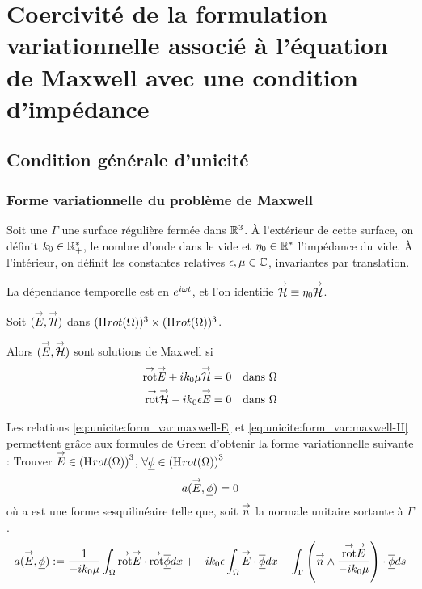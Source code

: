 \section{Coercivité de la formulation variationnelle associé à l'équation de Maxwell avec une condition d'impédance}
	\subsection{Condition générale d'unicité}
		\subsubsection{Forme variationnelle du problème de Maxwell}

			Soit une \(\Gamma\) une surface régulière fermée dans \(\mathbb R^3\). 
			À l'extérieur de cette surface, on définit \(k_0 \in \mathbb R_+^*\), le nombre d'onde dans le vide et \(\eta_0 \in \mathbb R^*\) l'impédance du vide.
			À l'intérieur, on définit les constantes relatives \(\epsilon,\mu \in \mathbb C\), invariantes par translation.

			\begin{tcolorbox}
				\centering
				La dépendance temporelle est en \(e^{i\omega t}\), et l'on identifie \({\overset{\rightarrow}{\mathcal{H}}} \equiv \eta _0 {\overset{\rightarrow}{\mathcal{H}}}\).
			\end{tcolorbox}

			Soit \(({\overset{\rightarrow}{E}},{\overset{\rightarrow}{\mathcal{H}}})\) dans \((\mathrm{H}_\mathrm{{}}{rot}(\Omega))^3 \times (\mathrm{H}_\mathrm{{}}{rot}(\Omega))^3\). 

			Alors \(({\overset{\rightarrow}{E}},{\overset{\rightarrow}{\mathcal{H}}})\) sont solutions de Maxwell si 
			\begin{align}
				\label{eq:unicite:form_var:maxwell-E}
				\trot \vE + ik_0 \mu \vH &= 0 && \text{dans \(\OO\)}
				\\\label{eq:unicite:form_var:maxwell-H}
				\trot \vH - ik_0\eps \vE &= 0 && \text{dans \(\OO\)}
			\end{align}

			Les relations \eqref{eq:unicite:form_var:maxwell-E} et \eqref{eq:unicite:form_var:maxwell-H} permettent grâce aux formules de Green d'obtenir la forme variationnelle suivante :
			Trouver \({\overset{\rightarrow}{E}} \in \left(\mathrm{H}_\mathrm{{}}{rot}(\Omega)\right)^3\), \(\forall \underline{\phi} \in \left(\mathrm{H}_\mathrm{{}}{rot}(\Omega)\right)^3\)
			\[
				a({\overset{\rightarrow}{E}},\underline{\phi}) = 0
			\]
			où a est une forme sesquilinéaire telle que, soit \({\overset{\rightarrow}{n}}\) la normale unitaire sortante à \(\Gamma\).
			\begin{align*}
				a({\overset{\rightarrow}{E}},\underline{\phi}) &:=  \dfrac{1}{-ik_0\mu} \int_\Omega {{\overset{\rightarrow}{\operatorname{rot}}}} {\overset{\rightarrow}{E}} \cdot {{\overset{\rightarrow}{\operatorname{rot}}}} {\overline{\underline{\phi}}} dx + -ik_0\epsilon\int_\Omega{\overset{\rightarrow}{E}}\cdot{\overline{\underline{\phi}}} dx
				 - \int_\Gamma \left({\overset{\rightarrow}{n}} \wedge \dfrac{{{\overset{\rightarrow}{\operatorname{rot}}}} {\overset{\rightarrow}{E}}}{-ik_0\mu}\right) \cdot {\overline{\underline{\phi}}} ds \\
			 \end{align*}

